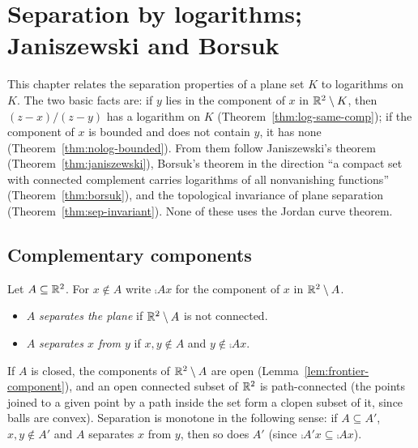 \chapter{Separation by logarithms; Janiszewski and Borsuk}\label{ch:sep}

This chapter relates the separation properties of a plane set $K$ to logarithms on $K$. The two
basic facts are: if $y$ lies in the component of $x$ in $\mathbb{R}^2\setminus K$, then
$(z-x)/(z-y)$ has a logarithm on $K$ (Theorem~\ref{thm:log-same-comp}); if the component of $x$ is
bounded and does not contain $y$, it has none (Theorem~\ref{thm:nolog-bounded}). From them follow
Janiszewski's theorem (Theorem~\ref{thm:janiszewski}), Borsuk's theorem in the direction ``a compact
set with connected complement carries logarithms of all nonvanishing functions''
(Theorem~\ref{thm:borsuk}), and the topological invariance of plane separation
(Theorem~\ref{thm:sep-invariant}). None of these uses the Jordan curve theorem.

\section{Complementary components}

\begin{definition}\label{def:separates}
Let $A\subseteq\mathbb{R}^2$. For $x\notin A$ write $\comp Ax$ for the component of $x$ in $\mathbb{R}^2\setminus A$.
\begin{itemize}
\item $A$ \emph{separates the plane} if $\mathbb{R}^2\setminus A$ is not connected.
\item $A$ \emph{separates $x$ from $y$} if $x,y\notin A$ and $y\notin\comp Ax$.
\end{itemize}
\end{definition}


If $A$ is closed, the components of $\mathbb{R}^2\setminus A$ are open (Lemma~\ref{lem:frontier-component}),
and an open connected subset of $\mathbb{R}^2$ is path-connected (the points joined to a given point by a
path inside the set form a clopen subset of it, since balls are convex). Separation is monotone in
the following sense: if $A\subseteq A'$, $x,y\notin A'$ and $A$ separates $x$ from $y$, then so does
$A'$ (since $\comp{A'}x\subseteq\comp Ax$).

